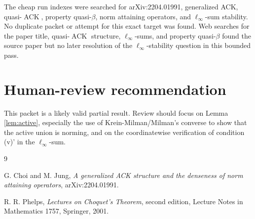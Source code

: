 \documentclass[11pt]{article}
\newcommand{\ACK}{\operatorname{ACK}}
\begin{document}
The cheap run indexes were searched for arXiv:2204.01991, generalized ACK,
quasi-\(\ACK\), property quasi-\(\beta\), norm attaining operators, and
\(\ell_\infty\)-sum stability.  No duplicate packet or attempt for this exact
target was found.  Web searches for the paper title, quasi-\(\ACK\) structure,
\(\ell_\infty\)-sums, and property quasi-\(\beta\) found the source paper but
no later resolution of the \(\ell_\infty\)-stability question in this bounded
pass.

\section*{Human-review recommendation}

This packet is a likely valid partial result.  Review should focus on Lemma
\ref{lem:active}, especially the use of Krein-Milman/Milman's converse to
show that the active union is norming, and on the coordinatewise verification
of condition (v)' in the \(\ell_\infty\)-sum.

\begin{thebibliography}{9}

G. Choi and M. Jung,
\emph{A generalized ACK structure and the denseness of norm attaining
operators}, arXiv:2204.01991.

R. R. Phelps,
\emph{Lectures on Choquet's Theorem}, second edition,
Lecture Notes in Mathematics 1757, Springer, 2001.

\end{thebibliography}
\end{document}
